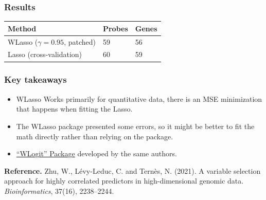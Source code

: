 \documentclass[
  letterpaper,
  DIV=11,
  numbers=noendperiod]{scrartcl}
\begin{document}
\hypertarget{results}{%
\subsubsection{Results}\label{results}}

\begin{longtable}[]{@{}lll@{}}
\toprule\noalign{}
Method & Probes & Genes \\
\midrule\noalign{}
\endhead
\bottomrule\noalign{}
\endlastfoot
WLasso (\(\gamma = 0.95\), patched) & 59 & 56 \\
Lasso (cross-validation) & 60 & 59 \\
\end{longtable}

\hypertarget{key-takeaways}{%
\subsubsection{Key takeaways}\label{key-takeaways}}

\begin{itemize}
\item
  WLasso Works primarily for quantitative data, there is an MSE
  minimization that happens when fitting the Lasso.
\item
  The WLasso package presented some errors, so it might be better to fit
  the math directly rather than relying on the package.
\item
  \href{https://cran.r-project.org/web/packages/WLogit/WLogit.pdf}{``WLogit''
  Package} developed by the same authors.
\end{itemize}

\textbf{Reference.} Zhu, W., Lévy-Leduc, C. and Ternès, N. (2021). A
variable selection approach for highly correlated predictors in
high-dimensional genomic data. \emph{Bioinformatics}, 37(16),
2238--2244.
\end{document}
